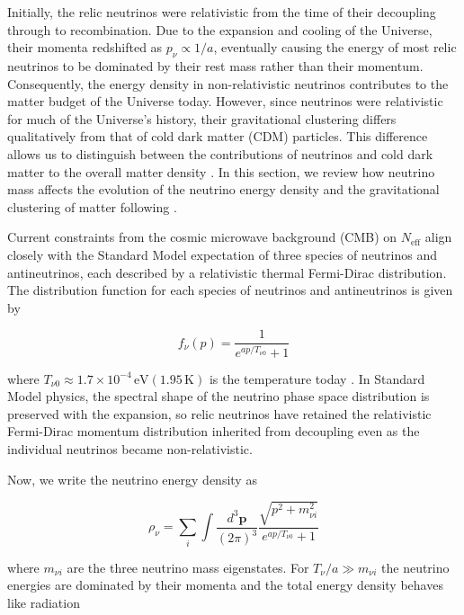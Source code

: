Initially, the relic neutrinos were relativistic from the time of their decoupling through to recombination. Due to the expansion and cooling of the Universe, their momenta redshifted as $p_{\nu} \propto 1 / a$, eventually causing the energy of most relic neutrinos to be dominated by their rest mass rather than their momentum. Consequently, the energy density in non-relativistic neutrinos contributes to the matter budget of the Universe today. However, since neutrinos were relativistic for much of the Universe's history, their gravitational clustering differs qualitatively from that of cold dark matter (CDM) particles. This difference allows us to distinguish between the contributions of neutrinos and cold dark matter to the overall matter density \cite{LESGOURGUES_2006}. In this section, we review how neutrino mass affects the evolution of the neutrino energy density and the gravitational clustering of matter following \cite{LESGOURGUES_2006, abazajian2016cmbs4sciencebookedition}.

Current constraints from the cosmic microwave background (CMB) on $N_{\text{eff}}$ \cite{PLanck20182020} align closely with the Standard Model expectation of three species of neutrinos and antineutrinos, each described by a relativistic thermal Fermi-Dirac distribution. The distribution function for each species of neutrinos and antineutrinos is given by


\begin{equation}
    f_{\nu}(p) = \frac{1}{e^{a p / T_{\nu 0}} + 1} \label{n.1}
\end{equation}

where $T_{\nu 0} \approx 1.7 \times 10^{-4} \, \mathrm{eV} (1.95 \, \mathrm{K})$ is the temperature today \cite{ParticleDataGroup:2022pth}. In Standard Model physics, the spectral shape of the neutrino phase space distribution is preserved with the expansion, so relic neutrinos have retained the relativistic Fermi-Dirac momentum distribution inherited from decoupling even as the individual neutrinos became non-relativistic.

Now, we write the neutrino energy density as

\begin{equation}
    \rho_{\nu} = \sum_{i} \int \frac{d^{3} \mathbf{p}}{(2 \pi)^{3}} \frac{\sqrt{p^{2} + m_{\nu i}^{2}}}{e^{a p / T_{\nu 0}} + 1}
    \label{n.2}
\end{equation}

where $m_{\nu i}$ are the three neutrino mass eigenstates. For $T_{\nu} / a \gg m_{\nu i}$ the neutrino energies are dominated by their momenta and the total energy density behaves like radiation


